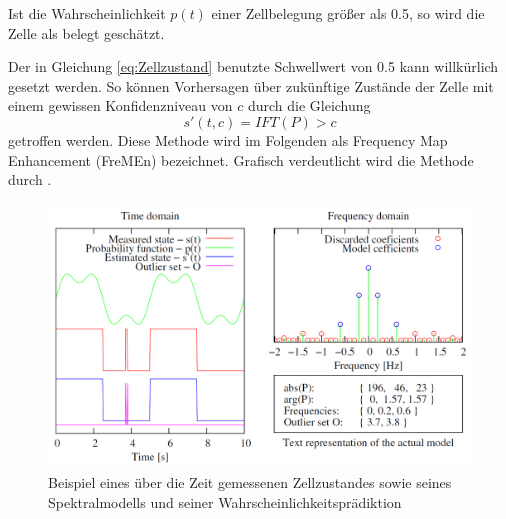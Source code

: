 Ist die Wahrscheinlichkeit $p(t)$ einer Zellbelegung größer als 0.5, so wird die Zelle als belegt geschätzt.

Der in Gleichung \ref{eq:Zellzustand} benutzte Schwellwert von 0.5 kann willkürlich gesetzt werden. So können Vorhersagen über zukünftige Zustände der Zelle mit einem gewissen Konfidenzniveau von $c$ durch die Gleichung
\begin{equation}
	s'(t,c) = IFT(P) > c
	\label{eq:Zustandsvorhersage}
\end{equation}
getroffen werden. Diese Methode wird im Folgenden als Frequency Map Enhancement (FreMEn) bezeichnet. Grafisch verdeutlicht wird die Methode durch . 

\begin{figure}[!ht]
	\begin{center}
		\includegraphics[height=70mm]{Abbildungen/stand_der_technik/example_of_measured_state_and_prediction}
		\caption{Beispiel eines über die Zeit gemessenen Zellzustandes sowie seines Spektralmodells und seiner Wahrscheinlichkeitsprädiktion\, \cite{Krajnik.2014}}
		\label{fig.FreMEn Beispiel}
	\end{center}
\end{figure}

